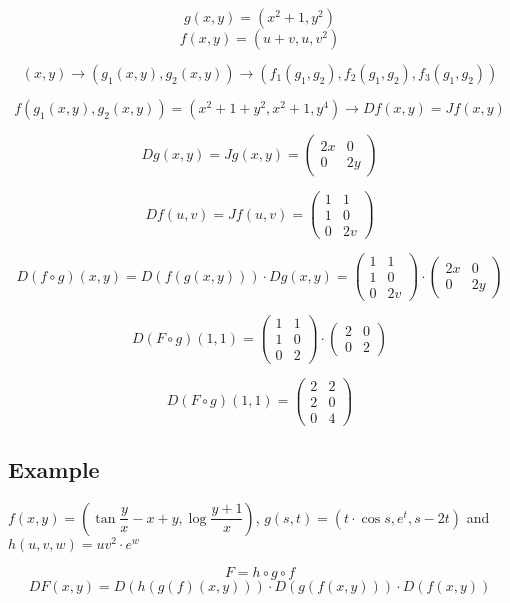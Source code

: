 \documentclass[11pt]{article}
\begin{document}
\[
g(x, y) = (x^2 + 1, y^2)
\]
\[
f(x, y) = (u + v, u, v^2)
\]

\[
(x, y) \rightarrow \left(g_1(x,y), g_2(x,y)\right) \rightarrow \left(f_1(g_1, g_2), f_2(g_1, g_2), f_3(g_1, g_2)\right)
\]

\[
f(g_1(x,y), g_2(x,y)) = (x^2 + 1 + y^2, x^2 + 1, y^4) \rightarrow Df(x, y) = Jf(x, y)
\]

\[
Dg(x, y) = Jg(x, y) = \begin{pmatrix}
2x & 0 \\
0 & 2y
\end{pmatrix}
\]

\[
Df(u, v) = Jf(u, v) = \begin{pmatrix}
1 & 1 \\
1 & 0 \\
0 & 2v
\end{pmatrix}
\]

\[
D(f \circ g)(x, y) = D(f(g(x, y))) \cdot Dg(x, y) = \begin{pmatrix}
1 & 1 \\
1 & 0 \\
0 & 2v
\end{pmatrix} \cdot \begin{pmatrix}
2x & 0 \\
0 & 2y
\end{pmatrix}
\]

\[
D(F \circ g)(1, 1) = \begin{pmatrix}
1 & 1 \\
1 & 0 \\
0 & 2
\end{pmatrix} \cdot \begin{pmatrix}
2 & 0 \\
0 & 2
\end{pmatrix}
\]

\[
D(F \circ g)(1, 1) = \begin{pmatrix}
2 & 2 \\
2 & 0 \\
0 & 4
\end{pmatrix}
\]

\subsection*{Example}
\( f(x,y) = \left( \tan \dfrac{y}{x} - x + y, \log \dfrac{y+1}{x} \right) \), \( g(s,t) = \left( t \cdot \cos s, e^t, s - 2t \right) \) and \( h(u, v, w) = uv^2 \cdot e^w \)

\[
F = h \circ g \circ f
\]
\[
DF(x, y) = D(h(g(f)(x, y))) \cdot D(g(f(x, y))) \cdot D(f(x, y))
\]
\end{document}
